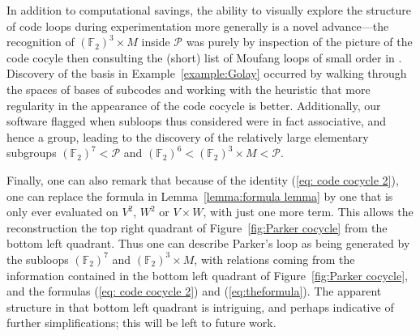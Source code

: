 \documentclass{article}
\theoremstyle{plain}
\theoremstyle{definition}
\def \cP {\mathcal{P}}
\def \FF {\mathbb{F}}
\begin{document}
In addition to computational savings, the ability to visually explore the structure of code loops during experimentation more generally is a novel advance---the recognition of $(\FF_2)^3\times M$ inside $\cP$ was purely by inspection of the picture of the code cocyle then consulting the (short) list of Moufang loops of small order in \cite{Chein}.
Discovery of the basis in Example~\ref{example:Golay} occurred by walking through the spaces of bases of subcodes and working with the heuristic that more regularity in the appearance of the code cocycle is better.
Additionally, our software flagged when subloops thus considered were in fact associative, and hence a group, leading to the discovery of the relatively large elementary subgroups $(\FF_2)^7 < \cP$ and $(\FF_2)^6 < (\FF_2)^3\times M < \cP$. 

Finally, one can also remark that because of the identity (\ref{eq: code cocycle 2}), one can replace the formula in Lemma~\ref{lemma:formula lemma} by one that is only ever evaluated on $V^2$, $W^2$ or $V\times W$, with just one more term. This allows the reconstruction the top right quadrant of Figure~\ref{fig:Parker cocycle} from the bottom left quadrant. 
Thus one can describe Parker's loop as being generated by the subloops $(\FF_2)^7$ and $(\FF_2)^3\times M$, with relations coming from the information contained in the bottom left quadrant of Figure~\ref{fig:Parker cocycle}, and the formulas (\ref{eq: code cocycle 2}) and (\ref{eq:theformula}).
The apparent structure in that bottom left quadrant is intriguing, and perhaps indicative of further simplifications; this will be left to future work.

\newpage
\end{document}
